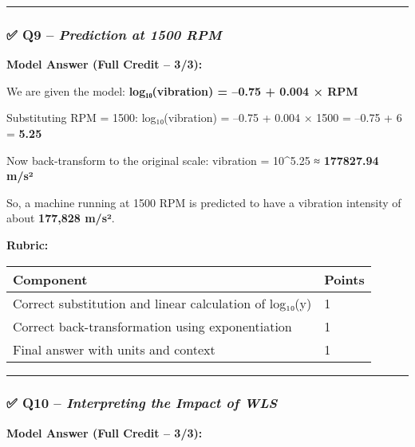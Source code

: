 \documentclass[
  letterpaper,
  DIV=11,
  numbers=noendperiod]{scrartcl}
\begin{document}
\begin{center}\rule{0.5\linewidth}{0.5pt}\end{center}

\subsubsection{\texorpdfstring{✅ Q9 -- \emph{Prediction at 1500
RPM}}{✅ Q9 -- Prediction at 1500 RPM}}\label{q9-prediction-at-1500-rpm}

\textbf{Model Answer (Full Credit -- 3/3):}

We are given the model: \textbf{log₁₀(vibration) = --0.75 + 0.004 × RPM}

Substituting RPM = 1500: log₁₀(vibration) = --0.75 + 0.004 × 1500 =
--0.75 + 6 = \textbf{5.25}

Now back-transform to the original scale: vibration = 10\^{}5.25 ≈
\textbf{177827.94 m/s²}

So, a machine running at 1500 RPM is predicted to have a vibration
intensity of about \textbf{177,828 m/s²}.

\textbf{Rubric:}

\begin{longtable}[]{@{}ll@{}}
\toprule\noalign{}
Component & Points \\
\midrule\noalign{}
\endhead
\bottomrule\noalign{}
\endlastfoot
Correct substitution and linear calculation of log₁₀(y) & 1 \\
Correct back-transformation using exponentiation & 1 \\
Final answer with units and context & 1 \\
\end{longtable}

\begin{center}\rule{0.5\linewidth}{0.5pt}\end{center}

\subsubsection{\texorpdfstring{✅ Q10 -- \emph{Interpreting the Impact
of
WLS}}{✅ Q10 -- Interpreting the Impact of WLS}}\label{q10-interpreting-the-impact-of-wls}

\textbf{Model Answer (Full Credit -- 3/3):}
\end{document}
